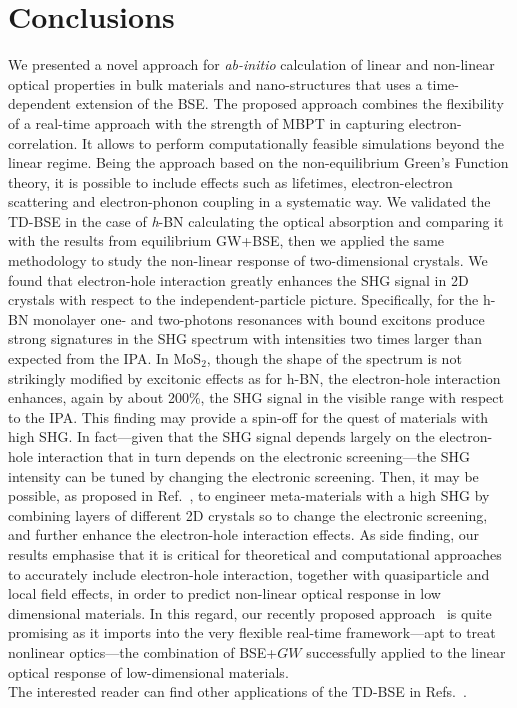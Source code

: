 \section{Conclusions}
We presented a novel approach for  \emph{ab-initio} calculation of linear and non-linear
optical properties in bulk materials and nano-structures that uses a
time-dependent extension of the BSE.
The proposed approach combines the flexibility of a real-time approach
with the strength of MBPT in capturing electron-correlation.  It
allows to perform computationally feasible simulations beyond the
linear regime.
Being the approach based on the non-equilibrium Green's Function theory, it is possible to
include effects such as lifetimes, electron-electron
scattering\cite{bsedynamic} and electron-phonon
coupling\cite{giustino2016electron} in a systematic way.
We validated the TD-BSE in the case of {\it h}-BN calculating
the optical absorption and comparing it with the results from equilibrium
GW+BSE, then we applied the same methodology to study the non-linear response of two-dimensional
crystals.
We found that electron-hole interaction greatly enhances the SHG signal in 2D crystals with respect to the independent-particle picture. Specifically, for the h-BN monolayer one- and two-photons resonances with bound excitons produce strong signatures in the SHG spectrum with intensities two times larger than expected from the IPA. In MoS$_2$, though the shape of the spectrum is not strikingly modified by excitonic effects as for h-BN, the electron-hole interaction enhances, again by about 200\%, the SHG signal in the visible range with respect to the IPA. 
This finding may provide a spin-off for the quest of materials with high SHG. In fact---given that the SHG signal depends largely on the electron-hole interaction that in turn depends on the electronic screening---the SHG intensity can be tuned by changing the electronic screening. Then, it may be possible, as proposed in Ref.~\cite{gao2012artificially}, to engineer meta-materials with a high SHG by combining layers of different 2D crystals\cite{gao2012artificially} so to change the electronic screening, and further enhance the electron-hole interaction effects.
As side finding, our results emphasise that it is critical for theoretical and computational approaches to accurately include electron-hole interaction, together with quasiparticle and local field effects, in order to predict non-linear optical response in low dimensional materials. In this regard, our recently proposed approach~\cite{nloptics2013,attaccalite} is quite promising as it imports into the very flexible real-time framework---apt to treat nonlinear optics---the combination of BSE+$GW$ successfully applied to the linear optical response of low-dimensional materials.\\ 
The interested reader can find other applications of the TD-BSE in Refs.~\cite{attaccalite2015strong,attaccalite1d}.
